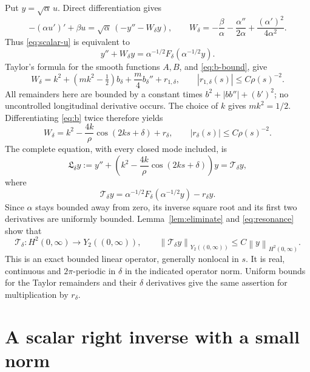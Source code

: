 \documentclass[11pt,a4paper]{article}
\newcommand{\Tcal}{\mathcal T}
\newcommand{\norm}[1]{\left\lVert#1\right\rVert}
\begin{document}
Put $y=\sqrt\alpha\,u$. Direct differentiation gives
\[
 -(\alpha u')'+\beta u
 =\sqrt\alpha\,(-y''-W_\delta y),\qquad
 W_\delta=-\frac\beta\alpha-\frac{\alpha''}{2\alpha}
                       +\frac{(\alpha')^2}{4\alpha^2}.
\]
Thus \eqref{eq:scalar-u} is equivalent to
\begin{equation}\label{eq:y-exact}
 y''+W_\delta y
 =\alpha^{-1/2}F_\delta(\alpha^{-1/2}y).
\end{equation}
Taylor's formula for the smooth functions $A,B$, and \eqref{eq:b-bound},
give
\begin{equation}\label{eq:Omega-expand}
 W_\delta
 =k^2+(mk^2-\tfrac12)b_\delta+\frac m4b_\delta''+r_{1,\delta},
 \qquad |r_{1,\delta}(s)|\le C\rho(s)^{-2}.
\end{equation}
All remainders here are bounded by a constant times
$b^2+|bb''|+(b')^2$; no uncontrolled longitudinal derivative occurs.
The choice of $k$ gives $mk^2=1/2$. Differentiating \eqref{eq:b} twice
therefore yields
\begin{equation}\label{eq:resonance}
 W_\delta=k^2-\frac{4k}{\rho}\cos(2ks+\delta)+r_\delta,
 \qquad |r_\delta(s)|\le C\rho(s)^{-2}.
\end{equation}
The complete equation, with every closed mode included, is
\begin{equation}\label{eq:full-scalar}
 \mathfrak L_\delta y:=
 y''+\left(k^2-\frac{4k}{\rho}\cos(2ks+\delta)\right)y
 =\Tcal_\delta y,
\end{equation}
where
\[
 \Tcal_\delta y=
 \alpha^{-1/2}F_\delta(\alpha^{-1/2}y)-r_\delta y.
\]
Since $\alpha$ stays bounded away from zero, its inverse square root
and its first two derivatives are uniformly bounded.
Lemma~\ref{lem:eliminate} and \eqref{eq:resonance} show that
\begin{equation}\label{eq:T-bound}
 \Tcal_\delta:H^2(0,\infty)\longrightarrow Y_2((0,\infty)),\qquad
 \norm{\Tcal_\delta y}_{Y_2((0,\infty))}\le C\norm{y}_{H^2(0,\infty)}.
\end{equation}
This is an exact bounded linear operator, generally nonlocal in $s$.
It is real, continuous and $2\pi$-periodic in $\delta$ in the indicated
operator norm. Uniform bounds for the Taylor remainders and their
$\delta$ derivatives give the same assertion for multiplication by
$r_\delta$.

\section{A scalar right inverse with a small norm}
\end{document}
